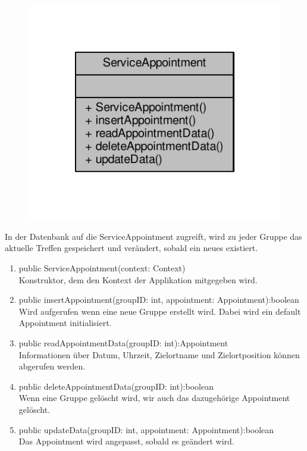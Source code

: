 \begin{figure}[H]
	\includegraphics[scale = 1]{res/umlClasses/service_appointment__coll__graph.pdf}
	\centering
\end{figure}
In der Datenbank auf die ServiceAppointment zugreift, wird zu jeder Gruppe das aktuelle Treffen gespeichert und verändert, sobald ein neues existiert.
\begin{enumerate}
	\item public ServiceAppointment(context: Context)\\
		Konstruktor, dem den Kontext der Applikation mitgegeben wird.
	\item public insertAppointment(groupID: int, appointment: Appointment):boolean\\
		Wird aufgerufen wenn eine neue Gruppe erstellt wird. Dabei wird ein default Appointment initialisiert.
	\item public readAppointmentData(groupID: int):Appointment \\
		Informationen über Datum, Uhrzeit, Zielortname und Zielortposition können abgerufen werden.
	\item public deleteAppointmentData(groupID: int):boolean \\
		Wenn eine Gruppe gelöscht wird, wir auch das dazugehörige Appointment gelöscht.
	\item public updateData(groupID: int, appointment: Appointment):boolean \\
		Das Appointment wird angepasst, sobald es geändert wird.
\end{enumerate}

